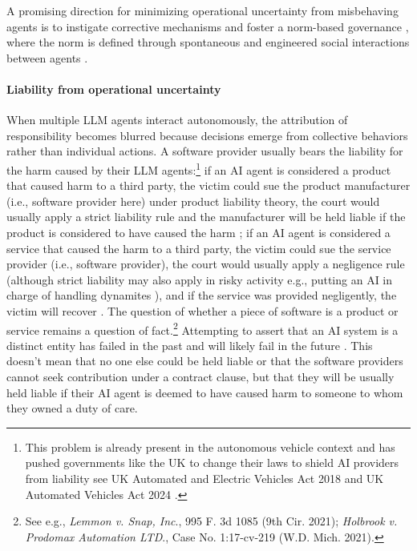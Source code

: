 \documentclass[11pt]{article}
\begin{document}
A promising direction for minimizing operational uncertainty from misbehaving agents is to instigate corrective mechanisms and foster a norm-based governance \citep{hadfield2019incomplete,kampik_governance_2022}, where the norm is defined through spontaneous and engineered social interactions between agents \citep{trivedi_altared_2024}.

\paragraph{Liability from operational uncertainty} When multiple LLM agents interact autonomously, the attribution of responsibility becomes blurred because decisions emerge from collective behaviors rather than individual actions. A software provider usually bears the liability for the harm caused by their LLM agents:\footnote{This problem is already present in the autonomous vehicle context and has pushed governments like the UK to change their laws to shield AI providers from liability see UK Automated and Electric Vehicles Act 2018 and UK Automated Vehicles Act 2024 \citep{soder_levels_2024}.} if an AI agent is considered a product that caused harm to a third party, the victim could sue the product manufacturer (i.e., software provider here) under product liability theory, the court would usually apply a strict liability rule and the manufacturer will be held liable if the product is considered to have caused the harm \citep{turner2018robot, Furr_2024, barfield2018liability}; if an AI agent is considered a service that caused the harm to a third party, the victim could sue the service provider (i.e., software provider), the court would usually apply a negligence rule (although strict liability may also apply in risky activity e.g., putting an AI in charge of handling dynamites \citep{reid_liability_1999}), and if the service was provided negligently, the victim will recover \citep{ramakrishnan2024us, barfield2018liability}.  The question of whether a piece of software is a product or service remains a question of fact.\footnote{See e.g., \textit{Lemmon v. Snap, Inc}., 995 F. 3d 1085 (9th Cir. 2021); \textit{Holbrook v. Prodomax Automation LTD}., Case No. 1:17-cv-219 (W.D. Mich. 2021).}  Attempting to assert that an AI system is a distinct entity has failed in the past and will likely fail in the future \citep{lior2024holding}. This doesn't mean that no one else could be held liable or that the software providers cannot seek contribution under a contract clause, but that they will be usually held liable if their AI agent is deemed to have caused harm to someone to whom they owned a duty of care.
\end{document}
